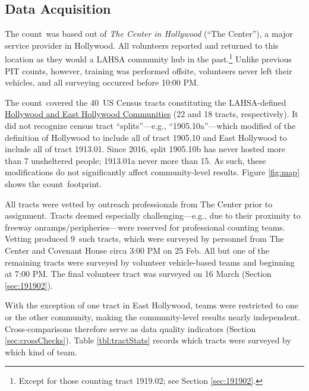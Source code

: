 \documentclass[11pt,twocolumn]{article}
\def\Count{count}
\def\ntracts{40}
\def\nprof{9}
\def\resp{respectively}
\begin{document}
\subsection{Data Acquisition}
\label{sec:acquisition}

The \Count\ was based out of {\it The Center in Hollywood} (``The Center''), a major service 
provider in Hollywood. All volunteers reported and returned to this location as they would a LAHSA 
community hub in the past.\footnote{Except for those counting tract 1919.02; see Section \ref{sec:191902}.} 
Unlike previous PIT counts, however, training was performed offsite, volunteers never left their vehicles, 
and all surveying occurred before 10:00 PM.

The \Count\ covered the \ntracts\ US Census tracts constituting the LAHSA-defined 
\href{https://www.lahsa.org/data?id=45-2020-homeless-count-by-community-city}{Hollywood 
and East Hollywood Communities} (22 and 18 tracts, \resp). It did not recognize census 
tract ``splits''---e.g., ``1905.10a''---which modified of the definition of Hollywood to include 
all of tract 1905.10 and East Hollywood to include all of tract 1913.01. Since 2016, split 1905.10b 
has never hosted more than 7 unsheltered people; 1913.01a never more than 15. As such,
these modifications do not significantly affect community-level results.
Figure \ref{fig:map} shows the \Count\ footprint.

All tracts were vetted by outreach professionals from The Center prior to assignment. Tracts 
deemed especially challenging---e.g., due to their proximity to freeway onramps/peripheries---were 
reserved for professional counting teams. Vetting produced \nprof\ such tracts, which were surveyed 
by personnel from The Center and Covenant House circa 3:00 PM on 25 Feb. All but one of the remaining 
tracts were surveyed by volunteer vehicle-based teams and beginning at 7:00 PM. The final volunteer tract 
was surveyed on 16 March (Section \ref{sec:191902}).

With the exception of one tract in East Hollywood, teams were restricted to one or the other community, 
making the community-level results nearly independent. Cross-comparisons therefore serve as data 
quality indicators (Section \ref{sec:crossChecks}). Table \ref{tbl:tractStats} records which tracts were 
surveyed by which kind of team. 
\end{document}
